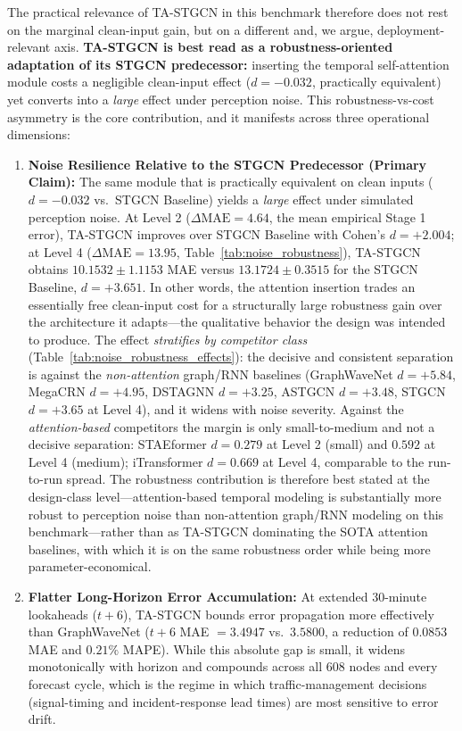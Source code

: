\documentclass[journal,twocolumn]{IEEEtran}
\begin{document}
The practical relevance of TA-STGCN in this benchmark therefore does not rest on the marginal clean-input gain, but on a different and, we argue, deployment-relevant axis. \textbf{TA-STGCN is best read as a robustness-oriented adaptation of its STGCN predecessor:} inserting the temporal self-attention module costs a negligible clean-input effect ($d = -0.032$, practically equivalent) yet converts into a \emph{large} effect under perception noise. This robustness-vs-cost asymmetry is the core contribution, and it manifests across three operational dimensions:
\begin{enumerate}
    \item \textbf{Noise Resilience Relative to the STGCN Predecessor (Primary Claim):} The same module that is practically equivalent on clean inputs ($d = -0.032$ vs.\ STGCN Baseline) yields a \emph{large} effect under simulated perception noise. At Level 2 ($\Delta\text{MAE}=4.64$, the mean empirical Stage 1 error), TA-STGCN improves over STGCN Baseline with Cohen's $d = +2.004$; at Level 4 ($\Delta \text{MAE} = 13.95$, Table~\ref{tab:noise_robustness}), TA-STGCN obtains $10.1532 \pm 1.1153$ MAE versus $13.1724 \pm 0.3515$ for the STGCN Baseline, $d = +3.651$. In other words, the attention insertion trades an essentially free clean-input cost for a structurally large robustness gain over the architecture it adapts---the qualitative behavior the design was intended to produce. The effect \emph{stratifies by competitor class} (Table~\ref{tab:noise_robustness_effects}): the decisive and consistent separation is against the \emph{non-attention} graph/RNN baselines (GraphWaveNet $d = +5.84$, MegaCRN $d = +4.95$, DSTAGNN $d = +3.25$, ASTGCN $d = +3.48$, STGCN $d = +3.65$ at Level 4), and it widens with noise severity. Against the \emph{attention-based} competitors the margin is only small-to-medium and not a decisive separation: STAEformer $d = 0.279$ at Level 2 (small) and $0.592$ at Level 4 (medium); iTransformer $d = 0.669$ at Level 4, comparable to the run-to-run spread. The robustness contribution is therefore best stated at the design-class level---attention-based temporal modeling is substantially more robust to perception noise than non-attention graph/RNN modeling on this benchmark---rather than as TA-STGCN dominating the SOTA attention baselines, with which it is on the same robustness order while being more parameter-economical.
    \item \textbf{Flatter Long-Horizon Error Accumulation:} At extended 30-minute lookaheads ($t+6$), TA-STGCN bounds error propagation more effectively than GraphWaveNet ($t+6$ MAE $= 3.4947$ vs.\ $3.5800$, a reduction of $0.0853$ MAE and $0.21\%$ MAPE). While this absolute gap is small, it widens monotonically with horizon and compounds across all $608$ nodes and every forecast cycle, which is the regime in which traffic-management decisions (signal-timing and incident-response lead times) are most sensitive to error drift.

\end{enumerate}
\end{document}
